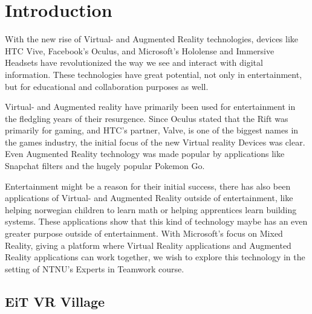 \chapter{Introduction}
With the new rise of Virtual- and Augmented Reality technologies, devices like HTC Vive, Facebook's Oculus, and Microsoft's Hololense and Immersive Headsets have revolutionized the way we see and interact with digital information. These technologies have great potential, not only in entertainment, but for educational and collaboration purposes as well.

Virtual- and Augmented reality have primarily been used for entertainment in the fledgling years of their resurgence. Since Oculus stated that the Rift was primarily for gaming\cite{OculusMarkZuckerberg}, and HTC's partner, Valve, is one of the biggest names in the games industry\cite{ValveBigName}, the initial focus of the new Virtual reality Devices was clear. Even Augmented Reality technology was made popular by applications like Snapchat\cite{Snapchat} filters and the hugely popular Pokemon Go\cite{PokemonGo}.

Entertainment might be a reason for their initial success, there has also been applications of Virtual- and Augmented Reality outside of entertainment, like helping norwegian children to learn math\cite{innomag2017} or helping apprentices learn building systems\cite{Nordbohus2017}. These applications show that this kind of technology maybe has an even greater purpose outside of entertainment. With Microsoft's focus on Mixed Reality, giving a platform where Virtual Reality applications and Augmented Reality applications can work together, we wish to explore this technology in the setting of NTNU's Experts in Teamwork course.



    
    \section{EiT VR Village}
